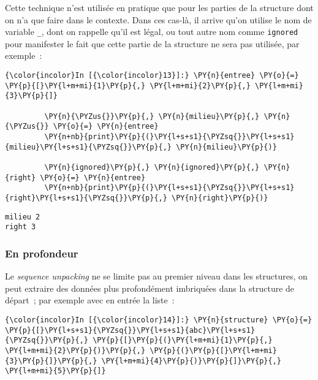     Cette technique n'est utilisée en pratique que pour les parties de la
structure dont on n'a que faire dans le contexte. Dans ces cas-là, il
arrive qu'on utilise le nom de variable \texttt{\_}, dont on rappelle
qu'il est légal, ou tout autre nom comme \texttt{ignored} pour
manifester le fait que cette partie de la structure ne sera pas
utilisée, par exemple~:

    \begin{Verbatim}[commandchars=\\\{\},frame=single,framerule=0.3mm,rulecolor=\color{cellframecolor}]
{\color{incolor}In [{\color{incolor}13}]:} \PY{n}{entree} \PY{o}{=} \PY{p}{[}\PY{l+m+mi}{1}\PY{p}{,} \PY{l+m+mi}{2}\PY{p}{,} \PY{l+m+mi}{3}\PY{p}{]}
         
         \PY{n}{\PYZus{}}\PY{p}{,} \PY{n}{milieu}\PY{p}{,} \PY{n}{\PYZus{}} \PY{o}{=} \PY{n}{entree}
         \PY{n+nb}{print}\PY{p}{(}\PY{l+s+s1}{\PYZsq{}}\PY{l+s+s1}{milieu}\PY{l+s+s1}{\PYZsq{}}\PY{p}{,} \PY{n}{milieu}\PY{p}{)}
         
         \PY{n}{ignored}\PY{p}{,} \PY{n}{ignored}\PY{p}{,} \PY{n}{right} \PY{o}{=} \PY{n}{entree}
         \PY{n+nb}{print}\PY{p}{(}\PY{l+s+s1}{\PYZsq{}}\PY{l+s+s1}{right}\PY{l+s+s1}{\PYZsq{}}\PY{p}{,} \PY{n}{right}\PY{p}{)}
\end{Verbatim}


    \begin{Verbatim}[commandchars=\\\{\},frame=single,framerule=0.3mm,rulecolor=\color{cellframecolor}]
milieu 2
right 3
\end{Verbatim}

    \hypertarget{en-profondeur}{%
\subsubsection{En profondeur}\label{en-profondeur}}

    Le \emph{sequence unpacking} ne se limite pas au premier niveau dans les
structures, on peut extraire des données plus profondément imbriquées
dans la structure de départ~; par exemple avec en entrée la liste~:

    \begin{Verbatim}[commandchars=\\\{\},frame=single,framerule=0.3mm,rulecolor=\color{cellframecolor}]
{\color{incolor}In [{\color{incolor}14}]:} \PY{n}{structure} \PY{o}{=} \PY{p}{[}\PY{l+s+s1}{\PYZsq{}}\PY{l+s+s1}{abc}\PY{l+s+s1}{\PYZsq{}}\PY{p}{,} \PY{p}{[}\PY{p}{(}\PY{l+m+mi}{1}\PY{p}{,} \PY{l+m+mi}{2}\PY{p}{)}\PY{p}{,} \PY{p}{(}\PY{p}{[}\PY{l+m+mi}{3}\PY{p}{]}\PY{p}{,} \PY{l+m+mi}{4}\PY{p}{)}\PY{p}{]}\PY{p}{,} \PY{l+m+mi}{5}\PY{p}{]}
\end{Verbatim}



